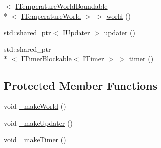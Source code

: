 \begin{DoxyCompactItemize}
$<$ \hyperlink{class_i_temperature_world_boundable}{I\-Temperature\-World\-Boundable}\\*
$<$ \hyperlink{class_i_temperature_world}{I\-Temperature\-World} $>$ $>$ \hyperlink{class_bound_temperature_world_injector_a94a6c343fa6f0a8aa7640ba4338de3e4}{world} ()
\item 
std\-::shared\-\_\-ptr$<$ \hyperlink{class_i_updater}{I\-Updater} $>$ \hyperlink{class_bound_temperature_world_injector_ab14750f84b51f9fc1b1a4d1c19b03c19}{updater} ()
\item 
std\-::shared\-\_\-ptr\\*
$<$ \hyperlink{class_i_timer_blockable}{I\-Timer\-Blockable}$<$ \hyperlink{class_i_timer}{I\-Timer} $>$ $>$ \hyperlink{class_bound_temperature_world_injector_a9e26e356da13bae69d852c5b44d14bee}{timer} ()
\end{DoxyCompactItemize}
\subsection*{Protected Member Functions}
\begin{DoxyCompactItemize}
\item 
void \hyperlink{class_bound_temperature_world_injector_a91a04f4aef416fdb0d2351d67073ca7d}{\-\_\-make\-World} ()
\item 
void \hyperlink{class_bound_temperature_world_injector_a1500a30682f3fdf02b79d48a6d493586}{\-\_\-make\-Updater} ()
\item 
void \hyperlink{class_bound_temperature_world_injector_a5d11cb09bec8a8b026b900601d6dce73}{\-\_\-make\-Timer} ()
\end{DoxyCompactItemize}
